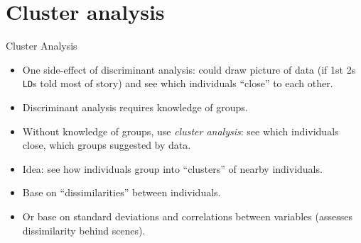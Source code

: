 \section{Cluster analysis}
\frame{\sectionpage}


\begin{frame}[fragile]{Cluster Analysis}

  \begin{itemize}
  \item One side-effect of discriminant analysis: could draw picture of data (if 1st 2s \texttt{LD}s told most of story) and see which individuals ``close'' to each other.
  \item Discriminant analysis requires knowledge of groups.
  \item Without knowledge of groups, use {\em cluster analysis}: see which individuals close, which groups suggested by data.
  \item Idea: see how individuals group into ``clusters'' of nearby individuals.
  \item Base on ``dissimilarities'' between individuals.
  \item Or base on standard deviations and correlations between variables (assesses dissimilarity behind scenes).
  \end{itemize}

\end{frame}

